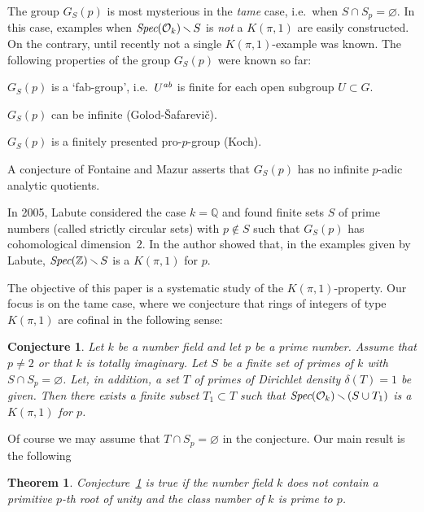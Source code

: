 \documentclass[10pt]{article}
\newcommand{\Spec}{\text{\it Spec}}
\newcommand{\Q}{{\mathbb Q}}
\newcommand{\Z}{{\mathbb Z}}
\renewcommand{\O}{{\mathcal{O}}}
\newcommand{\ab}{\text{\it ab}}
\newcommand{\sm}{{\,\smallsetminus\,}}
\theoremstyle{alex}
\newtheorem{itheorem}{Theorem}
\newtheorem{conjecture}{Conjecture}
\theoremstyle{alexdef}
\begin{document}
\medskip
The group $G_S(p)$  is most mysterious in the {\it tame} case, i.e.\ when $S\cap S_p=\varnothing$. In this case, examples when $\Spec(\O_k)\sm S$ is {\it not} a $K(\pi,1)$ are easily constructed. On the contrary, until recently not a single $K(\pi,1)$-example was known.   The following properties of the group $G_S(p)$ were known so far:

\pagebreak
\begin{compactitem}
\item $G_S(p)$ is a `fab-group', i.e.\ $U^\ab$ is finite for each open subgroup $U\subset G$.
\item $G_S(p)$ can be infinite (Golod-\v Safarevi\v c).
\item $G_S(p)$ is a finitely presented pro-$p$-group (Koch).
\end{compactitem}

\smallskip\noindent
A conjecture of Fontaine and Mazur \cite{FM} asserts that $G_S(p)$ has no infinite $p$-adic analytic quotients.

\bigskip
In 2005, Labute considered the case $k=\Q$ and found finite sets  $S$ of prime numbers (called strictly circular sets) with $p\notin S$ such that $G_S(p)$ has cohomological dimension~$2$. In \cite{S} the author showed that, in the examples given by Labute,  $\Spec(\Z)\sm S$ is a $K(\pi,1)$ for $p$.

The objective of this paper is a systematic study of the $K(\pi,1)$-property. Our focus is on the tame case, where we conjecture that rings of integers of type $K(\pi,1)$ are cofinal in the following sense:

\begin{conjecture}\label{conj}
Let $k$ be a number field and let $p$ be a prime number. Assume that $p\neq 2$ or that $k$ is totally imaginary. Let $S$ be a finite set of primes of $k$ with $S\cap S_p=\varnothing$. Let, in addition, a set $T$ of primes of Dirichlet density $\delta(T)=1$ be given. Then there exists a finite subset $T_1\subset T$ such that
$
\Spec(\O_k)\sm (S\cup T_1)$
is a $K(\pi,1)$ for $p$.
\end{conjecture}
Of course we may assume that $T\cap S_p=\varnothing$ in the conjecture. Our main result is the following

\begin{itheorem} \label{exthmi}
Conjecture~\ref{conj} is true if the number field $k$ does not contain a primitive $p$-th root of unity and the class number of\/ $k$ is prime to $p$.
\end{itheorem}
\end{document}
